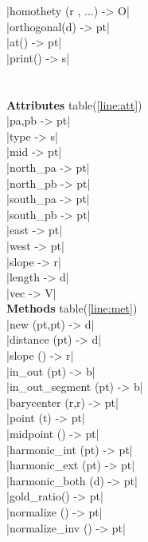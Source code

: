 \documentclass[DIV         = 14,
               fontsize    = 10,
               index       = totoc,
               twoside,
               cadre,
               headings    = small
               ]{tkz-doc}
\begin{document}
\begin{multicols}{3}
|homothety (r , ...)       -> O|   \\
|orthogonal(d)             -> pt|  \\
|at()                      -> pt|  \\
|print()                   -> s|   \\
                                   \\
               \\
\textbf{Attributes} table(\ref{line:att})  \\
|pa,pb                     -> pt|  \\
|type                      -> s|   \\
|mid                       -> pt|  \\
|north_pa                  -> pt|  \\
|north_pb                  -> pt|  \\
|south_pa                  -> pt|  \\
|south_pb                  -> pt|  \\
|east                      -> pt|  \\
|west                      -> pt|  \\
|slope                     -> r|   \\
|length                    -> d|   \\
|vec                       -> V|   \\
\textbf{Methods} table(\ref{line:met})     \\
|new (pt,pt)               -> d|   \\
|distance (pt)             -> d|   \\
|slope ()                  -> r|   \\
|in_out (pt)               -> b|   \\
|in_out_segment (pt)       -> b|   \\
|barycenter (r,r)          -> pt|  \\
|point (t)                 -> pt|  \\
|midpoint ()               -> pt|  \\
|harmonic_int (pt)         -> pt|  \\
|harmonic_ext (pt)         -> pt|  \\
|harmonic_both (d)         -> pt|  \\
|gold_ratio()              -> pt|  \\
|normalize ()              -> pt|  \\
|normalize_inv ()          -> pt|  \\

\end{multicols}
\end{document}
